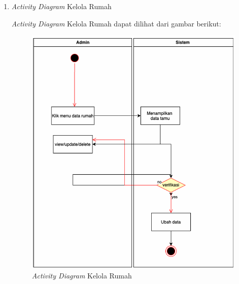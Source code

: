 \begin{enumerate}
    \item \textit{Activity Diagram} Kelola Rumah
        \par \textit{Activity Diagram} Kelola Rumah dapat dilihat dari gambar berikut:
            \begin{figure}
                \centering
                \includegraphics[width=0.95\linewidth]{uml/Activity Diagram - Kelola Rumah.png}
                \caption{\textit{Activity Diagram} Kelola Rumah}
                \label{fig:enter-label}
            \end{figure}
	

\end{enumerate}
